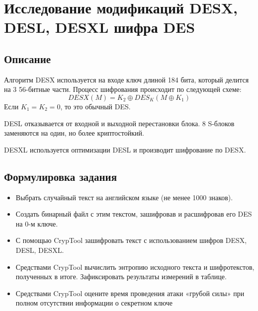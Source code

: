 \documentclass[a4paper, 14pt]{extarticle}
\begin{document}
\section{Исследование модификаций DESX, DESL, DESXL шифра DES}
\subsection{Описание}
Алгоритм DESX используется на входе ключ длиной 184 бита, который делится на 3 56-битные части. Процесс шифрования происходит по следующей схеме:
\[ DESX(M) = K_2 \oplus DES_K (M \oplus K_1) \]
Если $K_1 = K_2 = 0$, то это обычный DES.\@

DESL отказывается от входной и выходной перестановки блока. 8 S-блоков заменяются на один, но более криптостойкий.

DESXL используется оптимизации DESL и производит шифрование по DESX.\@

\subsection{Формулировка задания}
\begin{itemize}
    \item Выбрать случайный текст на английском языке (не менее 1000 знаков).
    \item Создать бинарный файл с этим текстом, зашифровав и расшифровав его DES на 0-м ключе.
    \item С помощью CrypTool зашифровать текст с использованием шифров DESX, DESL, DESXL.\@
    \item Средствами CrypTool вычислить энтропию исходного текста и шифротекстов, полученных в итоге. Зафиксировать результаты измерений в таблице.
    \item Средствами CrypTool оцените время проведения атаки «грубой силы» при полном отсутствии информации о секретном ключе
\end{itemize}
\end{document}
